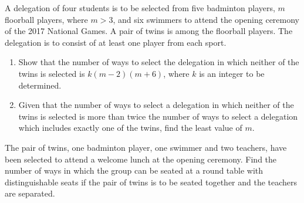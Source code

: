 \begin{problem}[\chili]
    A delegation of four students is to be selected from five badminton players, $m$ floorball players, where $m > 3$, and six swimmers to attend the opening ceremony of the 2017 National Games. A pair of twins is among the floorball players. The delegation is to consist of at least one player from each sport.

    \begin{enumerate}
        \item Show that the number of ways to select the delegation in which neither of the twins is selected is $k(m-2)(m+6)$, where $k$ is an integer to be determined.
        \item Given that the number of ways to select a delegation in which neither of the twins is selected is more than twice the number of ways to select a delegation which includes exactly one of the twins, find the least value of $m$.
    \end{enumerate}

    The pair of twins, one badminton player, one swimmer and two teachers, have been selected to attend a welcome lunch at the opening ceremony. Find the number of ways in which the group can be seated at a round table with distinguishable seats if the pair of twins is to be seated together and the teachers are separated.
\end{problem}